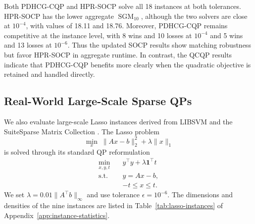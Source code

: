 \documentclass[letterpaper]{article} %
\newcommand{\name}{PDHCG-CQP\xspace}
\theoremstyle{definition}
\theoremstyle{remark}
\begin{document}
Both \name and HPR-SOCP solve all 18 instances at both tolerances. HPR-SOCP
has the lower aggregate $\operatorname{SGM}_{10}$, although the two solvers are
close at $10^{-4}$, with values of 18.11 and 18.76. Moreover, \name remains
competitive at the instance level, with 8 wins and 10 losses at $10^{-4}$ and
5 wins and 13 losses at $10^{-6}$. Thus the updated SOCP results show matching
robustness but favor HPR-SOCP in aggregate runtime. In contrast, the QCQP
results indicate that \name benefits more clearly when the quadratic
objective is retained and handled directly.

\subsection{Real-World Large-Scale Sparse QPs}
\label{sec:realworldqp}

We also evaluate large-scale Lasso instances derived from LIBSVM \cite{chang2011libsvm} and the SuiteSparse Matrix Collection \cite{davis2011university}. The Lasso problem
\begin{equation}
    \min_x \; \|Ax-b\|_2^2+\lambda\|x\|_1
\end{equation}
is solved through its standard QP reformulation
\begin{equation}
\begin{aligned}
    \min_{x,y,t}\quad & y^\top y+\lambda\mathbf 1^\top t\\
    \mathrm{s.t.}\quad & y=Ax-b,\\
    & -t\le x\le t .
\end{aligned}
\end{equation}
We set $\lambda=0.01\|A^\top b\|_\infty$ and use tolerance $\epsilon=10^{-6}$.
The dimensions and densities of the nine instances are listed in
Table~\ref{tab:lasso-instances} of Appendix~\ref{app:instance-statistics}.
\end{document}
